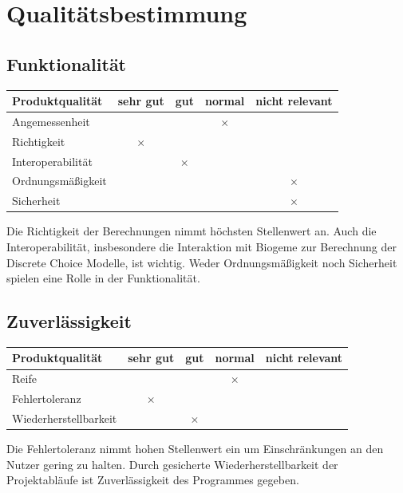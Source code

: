 \documentclass{article}
\begin{document}
\clearpage
\section{Qualitätsbestimmung}
\subsection{Funktionalität}
\begin{table}[H]
\centering
\begin{tabular}{lcccc}
\hline
\textbf{Produktqualität} & sehr gut & gut      & normal   & nicht relevant \\ \hline
Angemessenheit           &          &          & $\times$ &                \\
Richtigkeit              & $\times$ &          &          &                \\
Interoperabilität        &          & $\times$ &          &                \\
Ordnungsmäßigkeit        &          &          &          & $\times$       \\
Sicherheit               &          &          &          & $\times$       \\  
\end{tabular}
\end{table}
Die Richtigkeit der Berechnungen nimmt höchsten Stellenwert an. Auch die Interoperabilität, insbesondere die Interaktion mit Biogeme zur Berechnung der Discrete Choice Modelle, ist wichtig. Weder Ordnungsmäßigkeit noch Sicherheit spielen eine Rolle in der Funktionalität.

\subsection{Zuverlässigkeit}
\begin{table}[H]
\centering
\begin{tabular}{lcccc}
\hline
\textbf{Produktqualität} & sehr gut & gut      & normal   & nicht relevant \\ \hline
Reife                    &          &          & $\times$ &                \\
Fehlertoleranz           & $\times$ &          &          &                \\
Wiederherstellbarkeit    &          & $\times$ &          &                \\
\end{tabular}
\end{table}
Die Fehlertoleranz nimmt hohen Stellenwert ein um Einschränkungen an den Nutzer gering zu halten. Durch gesicherte Wiederherstellbarkeit der Projektabläufe ist Zuverlässigkeit des Programmes gegeben. 
\end{document}
